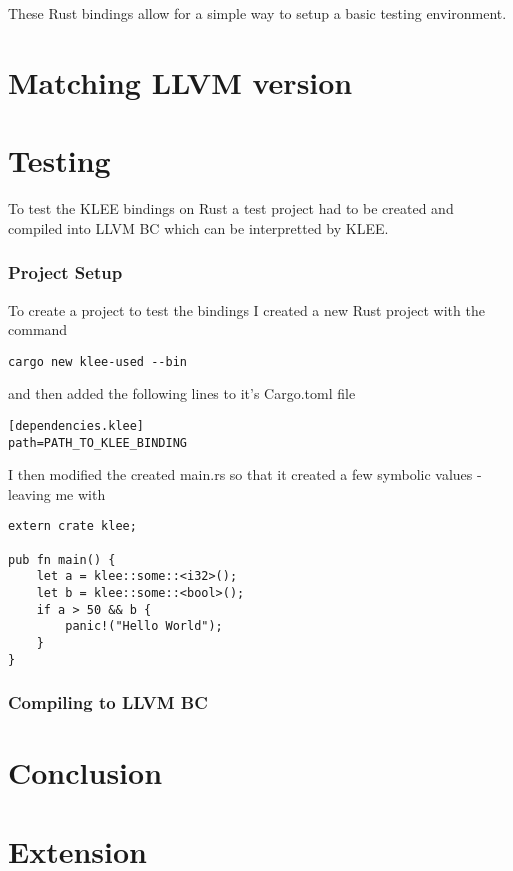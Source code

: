 \documentclass{report}
\begin{document}
These Rust bindings allow for a simple way to setup a basic testing environment.

\chapter {Matching LLVM version}
\chapter {Testing}

To test the KLEE bindings on Rust a test project had to be created and compiled into LLVM BC which can be interpretted by KLEE.

\subsection {Project Setup}
To create a project to test the bindings I created a new Rust project with the command
\begin{lstlisting}
cargo new klee-used --bin
\end{lstlisting}

and then added the following lines to it's Cargo.toml file
\begin{lstlisting}
[dependencies.klee]
path=PATH_TO_KLEE_BINDING
\end{lstlisting}

I then modified the created main.rs so that it created a few symbolic values - leaving me with
\begin{lstlisting}
extern crate klee;

pub fn main() {
    let a = klee::some::<i32>();
    let b = klee::some::<bool>();
    if a > 50 && b {
    	panic!("Hello World");
    }
}
\end{lstlisting}

\subsection {Compiling to LLVM BC}

\chapter {Conclusion}

\chapter {Extension}
\end{document}
